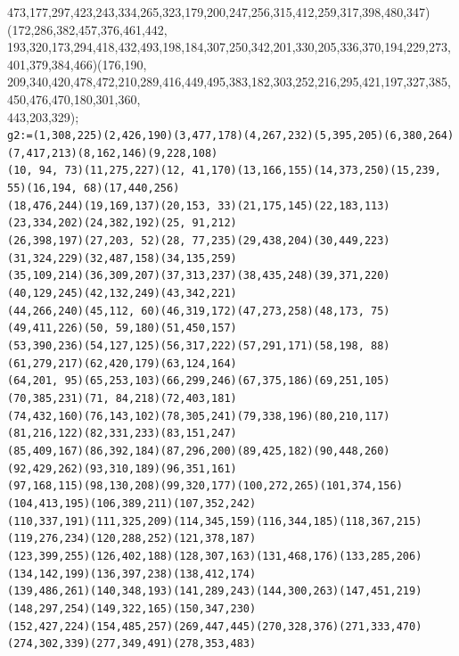 \documentclass[a4paper,twopage,reqno,12pt]{amsart}
\theoremstyle{definition}
\numberwithin{equation}{section}
\begin{document}
\begin{enumerate}
{{473,177,297,423,243,334,265,323,179,200,247,256,315,412,259,317,398,480,347)(172,286,382,457,376,461,442,\\
193,320,173,294,418,432,493,198,184,307,250,342,201,330,205,336,370,194,229,273,401,379,384,466)(176,190,
\\209,340,420,478,472,210,289,416,449,495,383,182,303,252,216,295,421,197,327,385,450,476,470,180,301,360,\\
443,203,329);}\\
\texttt{g2:=(1,308,225)(2,426,190)(3,477,178)(4,267,232)(5,395,205)(6,380,264)(7,417,213)(8,162,146)(9,228,108)\\
(10, 94, 73)(11,275,227)(12, 41,170)(13,166,155)(14,373,250)(15,239, 55)(16,194, 68)(17,440,256)\\
(18,476,244)(19,169,137)(20,153, 33)(21,175,145)(22,183,113)(23,334,202)(24,382,192)(25, 91,212)\\
(26,398,197)(27,203, 52)(28, 77,235)(29,438,204)(30,449,223)(31,324,229)(32,487,158)(34,135,259)\\
(35,109,214)(36,309,207)(37,313,237)(38,435,248)(39,371,220)(40,129,245)(42,132,249)(43,342,221)\\
(44,266,240)(45,112, 60)(46,319,172)(47,273,258)(48,173, 75)(49,411,226)(50, 59,180)(51,450,157)\\
(53,390,236)(54,127,125)(56,317,222)(57,291,171)(58,198, 88)(61,279,217)(62,420,179)(63,124,164)\\
(64,201, 95)(65,253,103)(66,299,246)(67,375,186)(69,251,105)(70,385,231)(71, 84,218)(72,403,181)\\
(74,432,160)(76,143,102)(78,305,241)(79,338,196)(80,210,117)(81,216,122)(82,331,233)(83,151,247)\\
(85,409,167)(86,392,184)(87,296,200)(89,425,182)(90,448,260)(92,429,262)(93,310,189)(96,351,161)\\
(97,168,115)(98,130,208)(99,320,177)(100,272,265)(101,374,156)(104,413,195)(106,389,211)(107,352,242)\\
(110,337,191)(111,325,209)(114,345,159)(116,344,185)(118,367,215)(119,276,234)(120,288,252)(121,378,187)\\
(123,399,255)(126,402,188)(128,307,163)(131,468,176)(133,285,206)(134,142,199)(136,397,238)(138,412,174)\\
(139,486,261)(140,348,193)(141,289,243)(144,300,263)(147,451,219)(148,297,254)(149,322,165)(150,347,230)\\
(152,427,224)(154,485,257)(269,447,445)(270,328,376)(271,333,470)(274,302,339)(277,349,491)(278,353,483)\\
}}
\end{enumerate}
\end{document}
